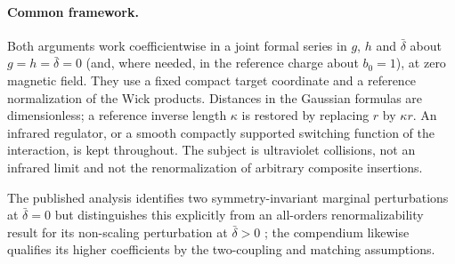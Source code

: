 \documentclass[11pt,a4paper]{article}
\numberwithin{equation}{section}
\newcommand{\db}{\bar\delta}
\begin{document}
\paragraph{Common framework.} Both arguments work coefficientwise in a joint formal series in $g$, $h$ and $\db$ about
$g=h=\db=0$ (and, where needed, in the reference charge about $b_0=1$), at zero magnetic field. They use a fixed compact
target coordinate and a reference normalization of the Wick products. Distances in the Gaussian formulas are
dimensionless; a reference inverse length $\kappa$ is restored by replacing $r$ by $\kappa r$. An infrared regulator,
or a smooth compactly supported switching function of the interaction, is kept throughout. The subject is ultraviolet
collisions, not an infrared limit and not the renormalization of arbitrary composite insertions.

The published analysis identifies two symmetry-invariant marginal perturbations at $\db=0$ but distinguishes this
explicitly from an all-orders renormalizability result for its non-scaling perturbation at $\db>0$
\cite[Secs.~3.2.3, 4 and~6]{Benedetti:2025nzp}; the compendium likewise qualifies its higher coefficients by the
two-coupling and matching assumptions.
\end{document}
